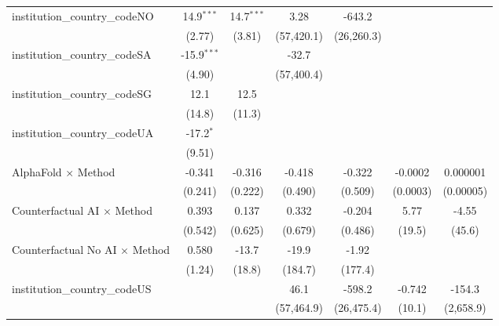 \begin{tabular}{lcccccc}
   institution\_country\_codeNO          & 14.9$^{***}$  & 14.7$^{***}$  & 3.28         & -643.2     &           &   \\   
                                         & (2.77)        & (3.81)        & (57,420.1)   & (26,260.3) &           &   \\   
   institution\_country\_codeSA          & -15.9$^{***}$ &               & -32.7        &            &           &   \\   
                                         & (4.90)        &               & (57,400.4)   &            &           &   \\   
   institution\_country\_codeSG          & 12.1          & 12.5          &              &            &           &   \\   
                                         & (14.8)        & (11.3)        &              &            &           &   \\   
   institution\_country\_codeUA          & -17.2$^{*}$   &               &              &            &           &   \\   
                                         & (9.51)        &               &              &            &           &   \\   
   AlphaFold $\times$ Method             & -0.341        & -0.316        & -0.418       & -0.322     & -0.0002   & 0.000001\\   
                                         & (0.241)       & (0.222)       & (0.490)      & (0.509)    & (0.0003)  & (0.00005)\\   
   Counterfactual AI $\times$ Method     & 0.393         & 0.137         & 0.332        & -0.204     & 5.77      & -4.55\\   
                                         & (0.542)       & (0.625)       & (0.679)      & (0.486)    & (19.5)    & (45.6)\\   
   Counterfactual No AI $\times$ Method  & 0.580         & -13.7         & -19.9        & -1.92      &           &   \\   
                                         & (1.24)        & (18.8)        & (184.7)      & (177.4)    &           &   \\   
   institution\_country\_codeUS          &               &               & 46.1         & -598.2     & -0.742    & -154.3\\   
                                         &               &               & (57,464.9)   & (26,475.4) & (10.1)    & (2,658.9)\\   

\end{tabular}
